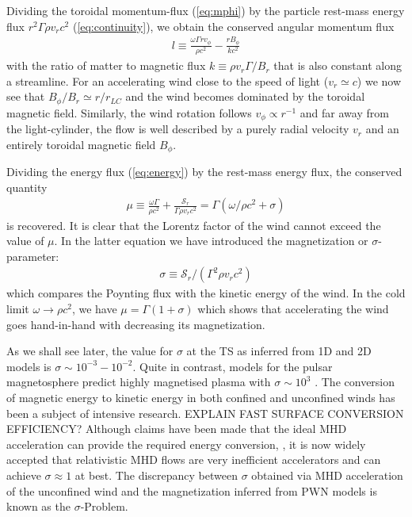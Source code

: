 Dividing the toroidal momentum-flux (\ref{eq:mphi}) by the particle rest-mass energy flux $r^2\Gamma \rho v_r c^2$ (\ref{eq:continuity}), we obtain the conserved angular momentum flux
%
\begin{align}
  l \equiv \frac{\omega\Gamma r v_\phi}{\rho c^2}-\frac{r B_\phi}{k c^2}
\end{align}
with the ratio of matter to magnetic flux $k\equiv\rho v_r \Gamma / B_r$ that is also constant along a streamline.  For an accelerating wind close to the speed of light ($v_r\simeq c$) we now see that $B_\phi/B_r\simeq r/r_{LC}$ and the wind becomes dominated by the toroidal magnetic field.  Similarly, the wind rotation follows $v_\phi\propto r^{-1}$ and far away from the light-cylinder, the flow is well described by a purely radial velocity $v_r$ and an entirely toroidal magnetic field $B_\phi$.

Dividing the energy flux (\ref{eq:energy}) by the rest-mass energy flux, the conserved quantity
\begin{align}
  \mu \equiv \frac{\omega \Gamma}{\rho c^2} + \frac{\mathcal{S}_r}{\Gamma \rho v_r c^2} = \Gamma (\omega/\rho c^2 + \sigma)
\end{align}
is recovered.  It is clear that the Lorentz factor of the wind cannot exceed the value of $\mu$.  In the latter equation we have introduced the magnetization or $\sigma$-parameter:
\begin{align}
  \sigma\equiv \mathcal{S}_r/(\Gamma^2\rho v_r c^2)
\end{align}
which compares the Poynting flux with the kinetic energy of the wind.  In the cold limit $\omega\to \rho c^2$, we have $\mu=\Gamma(1+\sigma)$ which shows that accelerating the wind goes hand-in-hand with decreasing its magnetization.

As we shall see later, the value for $\sigma$ at the TS as inferred from 1D and 2D models is $\sigma\sim10^{-3}-10^{-2}$.  Quite in contrast, models for the pulsar magnetosphere predict highly magnetised plasma with $\sigma\sim10^3$ \citep[e.g.][and references therein]{arons2012}.  
The conversion of magnetic energy to kinetic energy in both confined and unconfined winds has been a subject of intensive research.  EXPLAIN FAST SURFACE CONVERSION EFFICIENCY?
Although claims have been made that the ideal MHD acceleration can provide the required energy conversion, \cite[e.g.][]{vlahakis2004}, it is now widely accepted that relativistic MHD flows are very inefficient accelerators \citep[e.g.][]{2009MNRAS.394.1182K,2009ApJ...699.1789T,lyubarsky2009,Lyubarsky2010} and can achieve $\sigma\approx1$ at best.  
The discrepancy between $\sigma$ obtained via MHD acceleration of the unconfined wind and the magnetization inferred from PWN models is known as the $\sigma$-Problem.  

